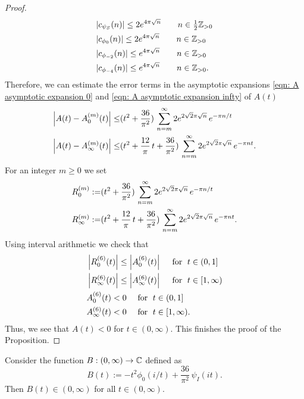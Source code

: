 \begin{proof}
\begin{align}\label{eqn: Fourier estimate 2}
&|c_{\psi_S}(n)|\leq 2e^{4\pi\sqrt{n}}\qquad n\in\tfrac 12 \mathbb{Z}_{>0} \\
&|c_{\phi_0}(n)|\leq 2e^{4\pi\sqrt{n}}\qquad n\in \mathbb{Z}_{>0} \\
&|c_{\phi_{-2}}(n)|\leq e^{4\pi\sqrt{n}}\qquad n\in  \mathbb{Z}_{>0} \\
&|c_{\phi_{-4}}(n)|\leq e^{4\pi\sqrt{n}}\qquad n\in \mathbb{Z}_{>0}. \label{eqn: Fourier estimate 5}
  \end{align}
Therefore, we can estimate the error terms in the asymptotic expansions \eqref{eqn: A asymptotic expansion 0} and \eqref{eqn: A asymptotic expansion infty} of $A(t)$
\begin{align}
\left|A(t)-A_0^{(m)}(t)\right|\leq& (t^2+\frac{36}{\pi^2})\,\sum_{n=m}^\infty 2e^{2\sqrt{2}\pi\sqrt{n}}\,e^{-\pi n/t}\notag\\
\left|A(t)-A_\infty^{(m)}(t)\right|\leq& (t^2+\frac{12}{\pi}\,t+\frac{36}{\pi^2})\,\sum_{n=m}^\infty 2e^{2\sqrt{2}\pi\sqrt{n}}\,e^{-\pi nt}.\notag
\end{align}
For an integer $m\geq0$ we set
\begin{align}
R^{(m)}_0:=&(t^2+\frac{36}{\pi^2})\,\sum_{n=m}^\infty 2e^{2\sqrt{2}\pi\sqrt{n}}\,e^{-\pi n/t}\notag\\
R^{(m)}_\infty:=&(t^2+\frac{12}{\pi}\,t+\frac{36}{\pi^2})\,\sum_{n=m}^\infty 2e^{2\sqrt{2}\pi\sqrt{n}}\,e^{-\pi nt}.\notag
\end{align}
Using interval arithmetic we check that
\begin{align}
&\left|R_0^{(6)}(t)\right|\leq\left|A_0^{(6)}(t)\right|\quad\mbox{ for }\;t\in(0,1]\notag\\
&\left|R_\infty^{(6)}(t)\right|\leq\left|A_\infty^{(6)}(t)\right|\quad\mbox{ for }\;t\in[1,\infty)\notag\\
&A_0^{(6)}(t)<0\quad\mbox{ for }\;t\in(0,1]\notag\\
&A_\infty^{(6)}(t)<0\quad\mbox{ for }\;t\in[1,\infty).\notag
\end{align}
Thus, we see that $A(t)<0$ for $t\in (0,\infty)$. This finishes the proof of the Proposition.
\end{proof}
\begin{proposition}\label{prop: inequalities B}
Consider the function $B:(0,\infty)\to\mathbb{C}$ defined as
$$B(t):=-t^2\phi_0(i/t)+\frac{36}{\pi^2}\,\psi_I(it).$$
Then $B(t)\in(0,\infty)$ for all $t\in(0,\infty).$
\end{proposition}

